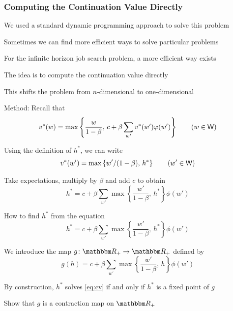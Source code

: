 \begin{frame}
    \frametitle{Computing the Continuation Value Directly}

    We used a standard dynamic programming approach to solve this problem

    Sometimes we can find more efficient ways to solve particular problems

    For the infinite horizon job search problem, a more efficient way exists

    The idea is to compute the continuation value directly

    This shifts the problem from $n$-dimensional to one-dimensional

\end{frame}


\begin{frame}
    
    Method: Recall that 
    \begin{equation*}
        v^*(w) 
        = 
        \max 
        \left\{
            \frac{w}{1-\beta}
            ,\,
            c + \beta \sum_{w'} v^*(w') \varphi(w')
        \right\}
        \qquad (w \in \mathsf W)
    \end{equation*}

    Using the definition of $h^*$, we can write 
    \begin{equation*}
        v^*(w') = \max \left\{ w'/(1-\beta) ,\, h^* \right\}
        \qquad (w' \in \mathsf W)
    \end{equation*}

    Take expectations, multiply by $\beta$ and add $c$ to obtain
    \begin{equation*}
        h^*
        = 
        c + \beta 
        \sum_{w'} \max 
        \left\{
            \frac{w'}{1-\beta}
            ,\,
            h^*
        \right\} \phi(w')
    \end{equation*}

\end{frame}


\begin{frame}

    How to find $h^*$ from the equation
    \begin{equation}\label{eq:cv}
        h^*
        = 
        c + \beta 
        \sum_{w'} \max 
        \left\{
            \frac{w'}{1-\beta}
            ,\,
            h^*
        \right\} \phi(w')
    \end{equation}

    
    We introduce the map $g \colon \RR_+ \to \RR_+$ defined by
    \begin{equation*}
        g(h)
        = 
        c + \beta
        \sum_{w'} \max 
        \left\{
            \frac{w'}{1-\beta}
            ,\,
            h
        \right\} \phi(w')
    \end{equation*}

    By construction, $h^*$ solves \eqref{eq:cv} if and only if $h^*$ is a fixed
    point of $g$  

    \vspace{1em}
    \Ex Show that $g$ is a contraction map on $\RR_+$ 

\end{frame}

